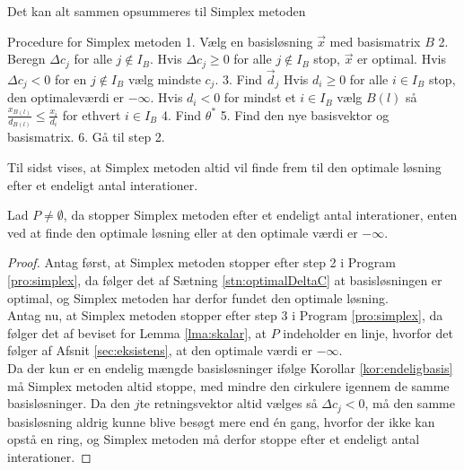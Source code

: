 Det kan alt sammen opsummeres til Simplex metoden

\begin{pro}[label=pro:simplex,style=ingental]{Procedure for Simplex metoden}
1. Vælg en basisløsning $\vec{x}$ med basismatrix $B$
2. Beregn $\Delta c_j$ for alle $j \notin I_B$. 
   Hvis $\Delta c_j\geq 0$ for alle $j \notin I_B$ 
   	   stop, $\vec{x}$ er optimal.
   Hvis $\Delta c_j < 0$ for en $j \notin I_B$
       vælg mindste $c_j$.
3. Find $\vec{d}_j$
   Hvis $d_i \geq 0 $ for alle $i \in I_B$ 
       stop, den optimaleværdi er $- \infty$.
   Hvis $d_i < 0 $ for mindst et $i \in I_B$ 
       vælg $B(l)$ så $\frac{x_{B(l)}}{d_{B(l)}}\leq \frac{x_i}{d_i} $ for ethvert $i \in I_B$
4. Find $\theta^*$
5. Find den nye basisvektor og basismatrix.
6. Gå til step 2.
\end{pro}

Til sidst vises, at Simplex metoden altid vil finde frem til den optimale løsning efter et endeligt antal interationer.

\begin{stn}
Lad $P \neq \emptyset$, da stopper Simplex metoden efter et endeligt antal interationer, enten ved at finde den optimale løsning eller at den optimale værdi er $- \infty$.
\end{stn}

\begin{proof}
Antag først, at Simplex metoden stopper efter step 2 i Program \ref{pro:simplex}, da følger det af Sætning \ref{stn:optimalDeltaC}
at basisløsningen er optimal, og Simplex metoden har derfor fundet den optimale løsning.\\ 
Antag nu, at Simplex metoden stopper efter step 3 i Program \ref{pro:simplex}, da følger det af beviset for Lemma \ref{lma:skalar}, at $P$ indeholder en linje, hvorfor det følger af Afsnit \ref{sec:eksistens},
at den optimale værdi er $-\infty$.\\ 
Da der kun er en endelig mængde basisløsninger ifølge Korollar \ref{kor:endeligbasis} må Simplex metoden altid stoppe, med mindre den cirkulere igennem de samme basisløsninger.
Da den $j$te retningsvektor altid vælges så $\Delta c_j < 0$, må den samme basisløsning aldrig kunne blive besøgt mere end én gang, hvorfor der ikke kan opstå en ring, og Simplex metoden må derfor stoppe efter et endeligt antal interationer.
\end{proof} 